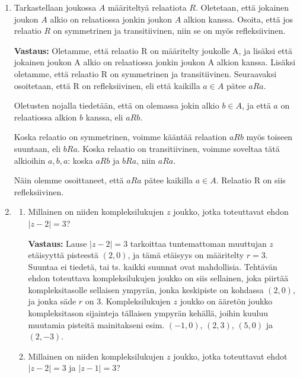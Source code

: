 \documentclass[a4paper,12pt]{article}
\begin{document}
\begin{enumerate}
Johtopäätös on siis se, että relaatiolle R muodostuu ääretön määrä ekvivalenssiluokkia; jokaiselle kokonaisluvulle muodostuu oma ekvivalenssiluokkansa. 
\vspace{1em}

\item Tarkastellaan joukossa $A$ m\"a\"aritelty\"a relaatiota $R$. Oletetaan, ett\"a jokainen joukon $A$ alkio on relaatiossa jonkin joukon $A$ alkion kanssa. Osoita, ett\"a jos relaatio $R$ on symmetrinen ja transitiivinen, niin se on my\"os refleksiivinen. 

\textbf{Vastaus:} Oletamme, että relaatio R on määritelty joukolle A, ja lisäksi että jokainen joukon A alkio on relaatiossa jonkin joukon A alkion kanssa. Lisäksi oletamme, että relaatio R on symmetrinen ja transitiivinen. Seuraavaksi osoitetaan, että R on refleksiivinen, eli että kaikilla $a\in A$ pätee $aRa$. 

Oletusten nojalla tiedetään, että on olemassa jokin alkio $b\in A$, ja että $a$ on relaatiossa alkion $b$ kanssa, eli $aRb$. 

Koska relaatio on symmetrinen, voimme kääntää relaation $aRb$ myös toiseen suuntaan, eli $bRa$. Koska relaatio on transitiivinen, voimme soveltaa tätä alkioihin $a,b,a$: koska $aRb$ ja $bRa$, niin $aRa$.

Näin olemme osoittaneet, että $aRa$ pätee kaikilla $a\in A$. Relaatio R on siis refleksiivinen. 

\item 
\begin{enumerate}
\item Millainen on niiden kompleksilukujen $z$ joukko, jotka toteuttavat ehdon \\  $|z-2|=3$?

\textbf{Vastaus:} Lause $|z-2|=3$ tarkoittaa tuntemattoman muuttujan $z$ etäisyyttä pisteestä $(2,0)$, ja tämä etäisyys on määritelty $r=3$. Suuntaa ei tiedetä, tai ts. kaikki suunnat ovat mahdollisia. Tehtävän ehdon toteuttava kompleksilukujen joukko on siis sellainen, joka piirtää kompleksitasolle sellaisen ympyrän, jonka keskipiste on kohdassa $(2,0)$, ja jonka säde $r$ on $3$. Kompleksilukujen $z$ joukko on ääretön joukko kompleksitason sijainteja tällaisen ympyrän kehällä, joihin kuuluu muutamia pisteitä mainitakseni esim. $(-1,0)$, $(2,3)$, $(5,0)$ ja $(2,-3)$. 

\item Millainen on niiden kompleksilukujen $z$ joukko, jotka toteuttavat ehdot \\ $|z-2|=3$ ja $|z-1|=3$?


\end{enumerate}
\end{enumerate}
\end{document}
